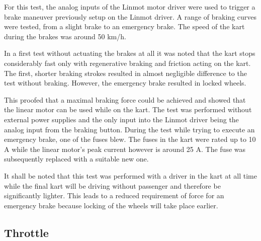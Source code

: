 For this test, the analog inputs of the Linmot motor driver were used to trigger a brake maneuver previously setup on the Linmot driver. A range of braking curves were tested, from a slight brake to an emergency brake. The speed of the kart during the brakes was around 50 km/h.

In a first test without actuating the brakes at all it was noted that the kart stops considerably fast only with regenerative braking and friction acting on the kart.
The first, shorter braking strokes resulted in almost negligible difference to the test without braking.
However, the emergency brake resulted in locked wheels.

 This proofed that a maximal braking force could be achieved and showed that the linear motor can be used while on the kart. The test was performed without external power supplies and the only input into the Linmot driver being the analog input from the braking button. During the test while trying to execute an emergency brake, one of the fuses blew. The fuses in the kart were rated up to 10 A while the linear motor's peak current however is around 25 A. The fuse was subsequently replaced with a suitable new one. 
 
 It shall be noted that this test was performed with a driver in the kart at all time while the final kart will be driving without passenger and therefore be significantly lighter. This leads to a reduced requirement of force for an emergency brake because locking of the wheels will take place earlier.

\subsection{Throttle}


